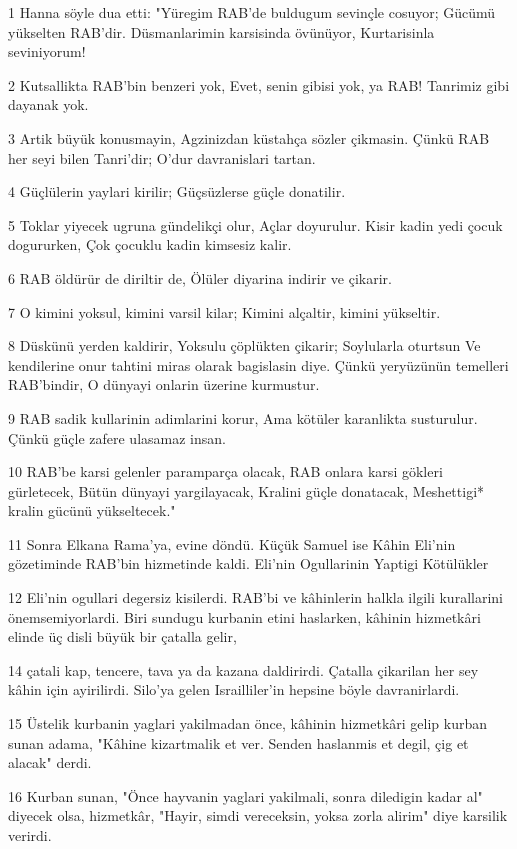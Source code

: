 \par 1 Hanna söyle dua etti: "Yüregim RAB'de buldugum sevinçle cosuyor; Gücümü yükselten RAB'dir. Düsmanlarimin karsisinda övünüyor, Kurtarisinla seviniyorum!
\par 2 Kutsallikta RAB'bin benzeri yok, Evet, senin gibisi yok, ya RAB! Tanrimiz gibi dayanak yok.
\par 3 Artik büyük konusmayin, Agzinizdan küstahça sözler çikmasin. Çünkü RAB her seyi bilen Tanri'dir; O'dur davranislari tartan.
\par 4 Güçlülerin yaylari kirilir; Güçsüzlerse güçle donatilir.
\par 5 Toklar yiyecek ugruna gündelikçi olur, Açlar doyurulur. Kisir kadin yedi çocuk dogururken, Çok çocuklu kadin kimsesiz kalir.
\par 6 RAB öldürür de diriltir de, Ölüler diyarina indirir ve çikarir.
\par 7 O kimini yoksul, kimini varsil kilar; Kimini alçaltir, kimini yükseltir.
\par 8 Düskünü yerden kaldirir, Yoksulu çöplükten çikarir; Soylularla oturtsun Ve kendilerine onur tahtini miras olarak bagislasin diye. Çünkü yeryüzünün temelleri RAB'bindir, O dünyayi onlarin üzerine kurmustur.
\par 9 RAB sadik kullarinin adimlarini korur, Ama kötüler karanlikta susturulur. Çünkü güçle zafere ulasamaz insan.
\par 10 RAB'be karsi gelenler paramparça olacak, RAB onlara karsi gökleri gürletecek, Bütün dünyayi yargilayacak, Kralini güçle donatacak, Meshettigi* kralin gücünü yükseltecek."
\par 11 Sonra Elkana Rama'ya, evine döndü. Küçük Samuel ise Kâhin Eli'nin gözetiminde RAB'bin hizmetinde kaldi. Eli'nin Ogullarinin Yaptigi Kötülükler
\par 12 Eli'nin ogullari degersiz kisilerdi. RAB'bi ve kâhinlerin halkla ilgili kurallarini önemsemiyorlardi. Biri sundugu kurbanin etini haslarken, kâhinin hizmetkâri elinde üç disli büyük bir çatalla gelir,
\par 14 çatali kap, tencere, tava ya da kazana daldirirdi. Çatalla çikarilan her sey kâhin için ayirilirdi. Silo'ya gelen Israilliler'in hepsine böyle davranirlardi.
\par 15 Üstelik kurbanin yaglari yakilmadan önce, kâhinin hizmetkâri gelip kurban sunan adama, "Kâhine kizartmalik et ver. Senden haslanmis et degil, çig et alacak" derdi.
\par 16 Kurban sunan, "Önce hayvanin yaglari yakilmali, sonra diledigin kadar al" diyecek olsa, hizmetkâr, "Hayir, simdi vereceksin, yoksa zorla alirim" diye karsilik verirdi.
